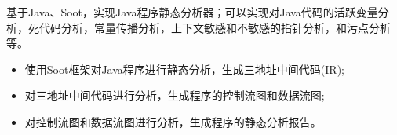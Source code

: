 \documentclass{resume}
\begin{document}
\Contents
{基于Java、Soot，实现Java程序静态分析器；可以实现对Java代码的活跃变量分析，死代码分析，常量传播分析，上下文敏感和不敏感的指针分析，和污点分析等。}
{\begin{itemize}
    \item 使用Soot框架对Java程序进行静态分析，生成三地址中间代码(IR);
    \item 对三地址中间代码进行分析，生成程序的控制流图和数据流图;
    \item 对控制流图和数据流图进行分析，生成程序的静态分析报告。
\end{itemize} }
\end{document}

